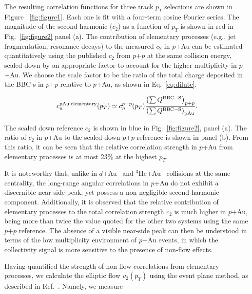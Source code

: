 \documentclass[%
reprint,
showpacs,preprintnumbers,
 amsmath,amssymb,
 aps,
]{revtex4-1}
\newcommand{\pt}{\mbox{$p_T$}\xspace}
\newcommand{\dau}{\mbox{$d$+Au}\xspace}
\newcommand{\pau}{\mbox{$p$+Au}\xspace}
\newcommand{\hau}{\mbox{$^3\text{He}$+Au}\xspace}
\newcommand{\pp}{\mbox{$p$+$p$}\xspace}
\begin{document}
The resulting correlation functions for three track \pt selections are shown in Figure ~\ref{fig:figure1}. Each one is fit with a four-term cosine Fourier series. The magnitude of the second harmonic ($c_{2}$) as a function of \pt is shown in red in Fig.~\ref{fig:figure2} panel (a). The contribution of elementary processes (e.g., jet fragmentation, resonance decays) to the measured $c_2$ in \pau can be estimated quantitatively using the published $c_2$ from \pp at the same collision energy, scaled down by an appropriate factor to account for the higher multiplicity in \pau. We choose the scale factor to be the ratio of the total charge deposited in the BBC-s in \pp relative to \pau, as shown in Eq.~\ref{eq:dilute}. 

\begin{equation}
c_{n}^{{\rm pAu \; elementary}}(p_{T}) \simeq c_{n}^{p+p}(p_{T})
\frac{\left( \sum Q^{{\rm BBC-S}} \right)_{p+p}}
{\left( \sum Q^{{\rm BBC-S}} \right)_{{\rm pAu}}
}.
\label{eq:dilute}
\end{equation}

The scaled down reference $c_{2}$ is shown in blue in Fig.~\ref{fig:figure2}, panel (a). The ratio of $c_2$ in \pau to the scaled-down \pp reference is shown in panel (b). From this ratio, it can be seen that the relative correlation strength in \pau from elementary processes is at most 23\% at the highest \pt.

It is noteworthy that, unlike in \dau~\cite{adare_measurement_2014} and \hau~\cite{PhysRevLett.115.142301} collisions at the same centrality, the long-range angular correlations in \pau do not exhibit a discernible near-side peak, yet possess a non-negligible second harmonic component. Additionally, it is observed that the relative contribution of elementary processes to the total correlation strength $c_2$ is much higher in \pau, being more than twice the value quoted for the other two systems using the same \pp reference. The absence of a visible near-side peak can then be understood in terms of the low multiplicity environment of \pau events, in which the collectivity signal is more sensitive to the presence of non-flow effects.


Having quantified the strength of non-flow correlations from elementary processes, we calculate the elliptic flow $v_2(p_T)$ using the event plane method, as described in Ref.~\cite{Poskanzer:1998yz}. Namely, we measure 
\end{document}
